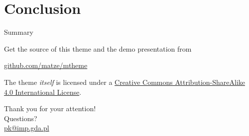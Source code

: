 \documentclass[10pt]{beamer} %
\begin{document}


\section{Conclusion}
\begin{frame}{Summary}

  Get the source of this theme and the demo presentation from

  \begin{center}\url{github.com/matze/mtheme}\end{center}

  The theme \emph{itself} is licensed under a
  \href{http://creativecommons.org/licenses/by-sa/4.0/}{Creative Commons
  Attribution-ShareAlike 4.0 International License}.

  \begin{center}\ccbysa\end{center}

\end{frame}
{
\begin{frame}[standout]
  Thank you for your attention!\\ \vspace{12pt}
  Questions?\\ \vspace{12pt}
  \url{pk@imp.gda.pl}
\end{frame}
}
\appendix
\end{document}
